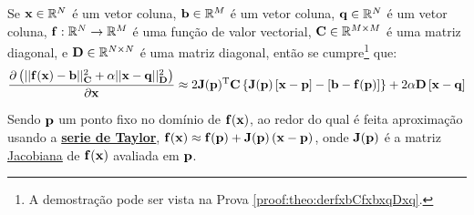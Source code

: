 \begin{theorem}\label{theo:derfxbCfxbxqDxq}
Se 
$\VECTOR{x}\in \mathbb{R}^N$ é um vetor coluna, 
$\VECTOR{b}\in \mathbb{R}^M$ é um vetor coluna,
$\VECTOR{q}\in \mathbb{R}^N$ é um vetor coluna, 
$\VECTOR{f}: \mathbb{R}^{N}\rightarrow \mathbb{R}^{M}$ é uma função de valor vectorial, 
$\MATRIX{C} \in \mathbb{R}^{M\times M}$ é uma matriz diagonal, e
$\MATRIX{D} \in \mathbb{R}^{N\times N}$ é uma matriz diagonal, 
então se cumpre\footnote{A demostração pode ser vista na Prova \ref{proof:theo:derfxbCfxbxqDxq}.} que:
\begin{equation}
\frac{\partial \left(||\VECTOR{f}(\VECTOR{x})-\VECTOR{b}||_{\MATRIX{C}}^2+\alpha||\VECTOR{x}-\VECTOR{q}||_{\MATRIX{D}}^2\right)}{\partial \VECTOR{x}} \approx
2 \MATRIX{J}(\VECTOR{p})^{\transpose}\MATRIX{C}\left\{\MATRIX{J}(\VECTOR{p})\left[\VECTOR{x} - \VECTOR{p}\right]-\left[\VECTOR{b}-\VECTOR{f}(\VECTOR{p})\right] \right\}
+2\alpha\MATRIX{D}\left[\VECTOR{x}-\VECTOR{q}\right]
\end{equation}

Sendo $\VECTOR{p}$ um ponto fixo no domínio de $\VECTOR{f}(\VECTOR{x})$,  ao redor do qual é feita  aproximação
usando a \hyperref[def:taylor]{\textbf{serie de Taylor}}, 
$\VECTOR{f}(\VECTOR{x})\approx \VECTOR{f}(\VECTOR{p})+\MATRIX{J}(\VECTOR{p})\left(\VECTOR{x}-\VECTOR{p}\right)$,
onde $\MATRIX{J}(\VECTOR{p})$ é a matriz \hyperref[def:jacobian]{Jacobiana} de $\VECTOR{f}(\VECTOR{x})$ avaliada em $\VECTOR{p}$.


\end{theorem}

